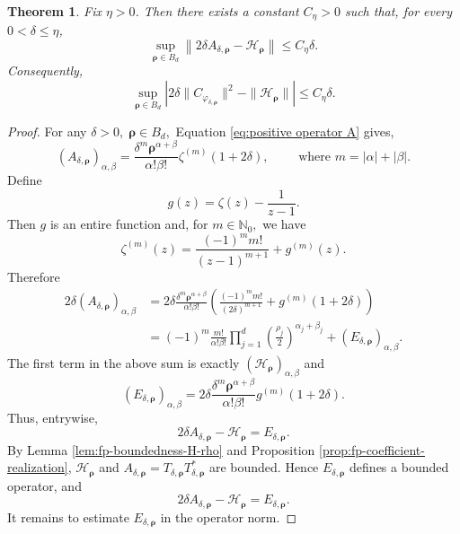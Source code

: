\documentclass[12pt, reqno]{amsart}
\numberwithin{equation}{section}
\newtheorem{theorem}{Theorem}[section]
\begin{document}
\begin{theorem}\label{main}
Fix \(\eta>0\). Then there exists a constant \(C_\eta>0\) such that,
for every \(0<\delta\leq\eta\),
\[
\sup_{\boldsymbol\rho\in B_d}
\left\|
2\delta A_{\delta,\boldsymbol\rho}
-
\mathcal H_{\boldsymbol\rho}
\right\|
\leq C_\eta\delta.
\]
Consequently,
\[
\sup_{\boldsymbol\rho\in B_d}
\left|
2\delta\|C_{\varphi_{\delta,\boldsymbol\rho}}\|^2
-
\|\mathcal H_{\boldsymbol\rho}\|
\right|
\leq C_\eta\delta.
\]
\end{theorem}



\begin{proof}

For any $\delta>0,\; \boldsymbol{\rho}\in B_d,$ Equation \eqref{eq:positive operator A} gives,
\[
(A_{\delta,\boldsymbol{\rho}})_{\alpha,\beta}
=
\frac{
\delta^m
\boldsymbol{\rho}^{\alpha+\beta}}
{\alpha!\beta!}
\zeta^{(m)}(1+2\delta), \qquad \text{ where } m=|\alpha|+|\beta|.
\]
Define
\[
g(z)
=
\zeta(z)-\frac{1}{z-1}.
\]
Then \(g\) is an entire function and, for $m\in\mathbb{N}_{0},$ we have
\[
\zeta^{(m)}(z)
=
\frac{(-1)^m m!}{(z-1)^{m+1}}
+
g^{(m)}(z).
\]
Therefore
\[
\begin{aligned}
2\delta(A_{\delta,\boldsymbol{\rho}})_{\alpha,\beta}
&=
2\delta
\frac{
\delta^m
\boldsymbol{\rho}^{\alpha+\beta}}
{\alpha!\beta!}
\left(
\frac{(-1)^m m!}{(2\delta)^{m+1}}
+
g^{(m)}(1+2\delta)
\right)                                                     \\
&=
(-1)^m
\frac{m!}{\alpha!\beta!}
\prod_{j=1}^{d}
\left(\frac{\rho_j}{2}\right)^{\alpha_j+\beta_j}
+
(E_{\delta,\boldsymbol{\rho}})_{\alpha,\beta}.
\end{aligned}
\]
The first term in the above sum is exactly $(\mathcal{H}_{\boldsymbol{\rho}})_{\alpha,\beta}$ and
\[
(E_{\delta,\boldsymbol{\rho}})_{\alpha,\beta}
=
2\delta
\frac{
\delta^m
\boldsymbol{\rho}^{\alpha+\beta}}
{\alpha!\beta!}
g^{(m)}(1+2\delta).
\]
Thus, entrywise,
\[
2\delta A_{\delta,\boldsymbol{\rho}}
-
\mathcal{H}_{\boldsymbol{\rho}}
=
E_{\delta,\boldsymbol{\rho}}.
\]
By Lemma \ref{lem:fp-boundedness-H-rho} and Proposition
\ref{prop:fp-coefficient-realization},
$\mathcal{H}_{\boldsymbol{\rho}}$ and
$A_{\delta,\boldsymbol{\rho}} = T_{\delta,\boldsymbol{\rho}} T_{\delta,\boldsymbol{\rho}}^{*}$
are  bounded.
Hence $E_{\delta,\boldsymbol{\rho}}$ defines a bounded operator, and \[
2\delta A_{\delta,\boldsymbol{\rho}}
-
\mathcal{H}_{\boldsymbol{\rho}}
=
E_{\delta,\boldsymbol{\rho}}.
\]
It remains to estimate
$E_{\delta,\boldsymbol{\rho}}$ in the operator norm.


\end{proof}
\end{document}
